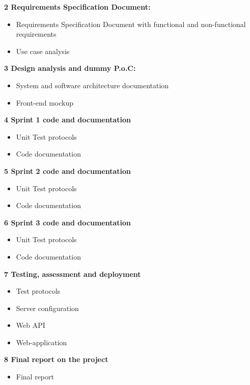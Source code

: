 \documentclass[notitlepage]{article}
\begin{document}
\begin{flushleft}
\textbf{2 Requirements Specification Document:}
\\
\begin{itemize}
	\item Requirements Specification Document with functional and non-functional requirements
	\item Use case analysis
\end{itemize}

\textbf{3 Design analysis and dummy P.o.C:}
\\
\begin{itemize}
	\item System and software architecture documentation
	\item Front-end mockup
\end{itemize}

\textbf{4 Sprint 1 code and documentation }
\\
\begin{itemize}
	\item Unit Test protocols
	\item Code documentation
\end{itemize}

\textbf{5  Sprint 2 code and documentation }
\\
\begin{itemize}
	\item Unit Test protocols
	\item Code documentation
\end{itemize}

\textbf{6 Sprint 3 code and documentation }
\\
\begin{itemize}
	\item Unit Test protocols
	\item Code documentation
\end{itemize}

\textbf{7 Testing, assessment and deployment}
\\
\begin{itemize}
	\item Test protocols
	\item Server configuration
	\item Web API 
	\item Web-application
\end{itemize}

\textbf{8 Final report on the project}
\\
\begin{itemize}
	\item Final report
\end{itemize}



\end{flushleft}
\end{document}
